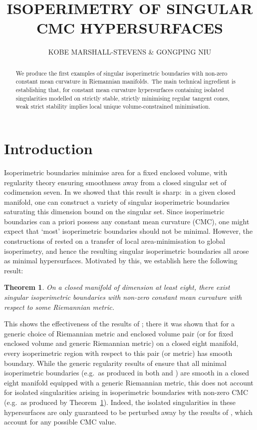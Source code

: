 \documentclass[12pt]{article}
\newtheorem{theorem}{Theorem}
\begin{document}
\title{\large \textbf{ISOPERIMETRY OF SINGULAR CMC HYPERSURFACES}}
\author{\small KOBE MARSHALL-STEVENS \& GONGPING NIU}
\date{\vspace{-4ex}}
\maketitle
\begin{abstract}
    \noindent We produce the first examples of singular isoperimetric boundaries with non-zero constant mean curvature in Riemannian manifolds.~The main technical ingredient is establishing that, for constant mean curvature hypersurfaces containing isolated singularities modelled on strictly stable, strictly minimising regular tangent cones, weak strict stability implies local unique volume-constrained minimisation.
    \end{abstract} 
\tableofcontents

\section{Introduction}

Isoperimetric boundaries minimise area for a fixed enclosed volume, with regularity theory ensuring smoothness away from a closed singular set of codimension seven. In \cite{MN26} we showed that this result is sharp:~in a given closed manifold, one can construct a variety of singular isoperimetric boundaries saturating this dimension bound on the singular set. Since isoperimetric boundaries can a priori possess any constant mean curvature (CMC), one might expect that `most' isoperimetric boundaries should not be minimal. However, the constructions of \cite{MN26} rested on a transfer of local area-minimisation to global isoperimetry, and hence the resulting singular isoperimetric boundaries all arose as minimal hypersurfaces. Motivated by this, we establish here the following result:

\begin{theorem}\label{thm: CMC singular isop}
    On a closed manifold of dimension at least eight, there exist singular isoperimetric boundaries with non-zero constant mean curvature with respect to some Riemannian metric.
\end{theorem}

This shows the effectiveness of the results of \cite{MNP25}; there it was shown that for a generic choice of Riemannian metric and enclosed volume pair (or for fixed enclosed volume and generic Riemannian metric) on a closed eight manifold, every isoperimetric region with respect to this pair (or metric) has smooth boundary. While the generic regularity results of \cite{LW25} ensure that all minimal isoperimetric boundaries (e.g.~as produced in both \cite{MN26} and \cite{N24}) are smooth in a closed eight manifold equipped with a generic Riemannian metric, this does not account for isolated singularities arising in isoperimetric boundaries with non-zero CMC (e.g.~as produced by Theorem~\ref{thm: CMC singular isop}). Indeed, the isolated singularities in these hypersurfaces are only guaranteed to be perturbed away by the results of \cite{MNP25}, which account for any possible CMC value.
\end{document}
